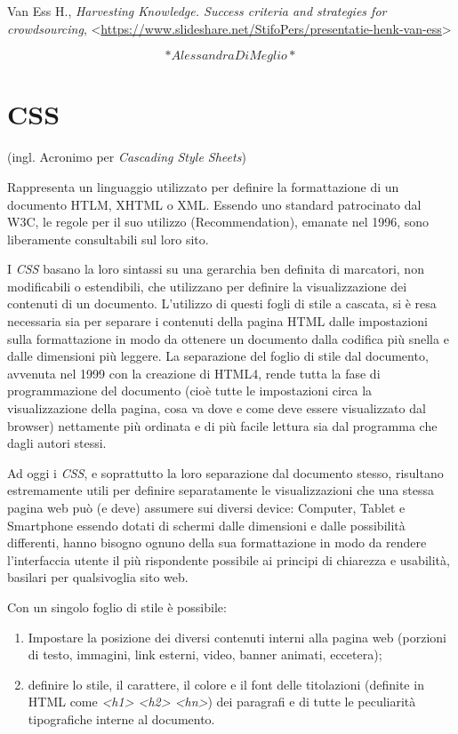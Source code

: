\documentclass[
  b5paper,
  twoside,
  11pt,
  chapterprefix=false,
  bibliography=totocnumbered,
  listof=flat]{scrbook}
\begin{document}
Van Ess H., \emph{Harvesting Knowledge. Success criteria and strategies for
crowdsourcing},
\textless{}\href{https://www.slideshare.net/StifoPers/presentatie-henk-van-ess}{{https://www.slideshare.net/StifoPers/presentatie-henk-van-ess}}\textgreater{}

\[*Alessandra Di Meglio*\]

\hypertarget{css}{%
\chapter{CSS}\label{css}}

(ingl. Acronimo per \emph{Cascading Style Sheets})

Rappresenta un linguaggio utilizzato per definire la formattazione di un
documento HTLM, XHTML o XML. Essendo uno standard patrocinato dal W3C,
le regole per il suo utilizzo (Recommendation), emanate nel 1996, sono
liberamente consultabili sul loro sito.

I \emph{CSS} basano la loro sintassi su una gerarchia ben definita di
marcatori, non modificabili o estendibili, che utilizzano per definire
la visualizzazione dei contenuti di un documento. L'utilizzo di questi
fogli di stile a cascata, si è resa necessaria sia per separare i
contenuti della pagina HTML dalle impostazioni sulla formattazione in
modo da ottenere un documento dalla codifica più snella e dalle
dimensioni più leggere. La separazione del foglio di stile dal
documento, avvenuta nel 1999 con la creazione di HTML4, rende tutta la
fase di programmazione del documento (cioè tutte le impostazioni circa
la visualizzazione della pagina, cosa va dove e come deve essere
visualizzato dal browser) nettamente più ordinata e di più facile
lettura sia dal programma che dagli autori stessi.

Ad oggi i \emph{CSS}, e soprattutto la loro separazione dal documento stesso,
risultano estremamente utili per definire separatamente le
visualizzazioni che una stessa pagina web può (e deve) assumere sui
diversi device: Computer, Tablet e Smartphone essendo dotati di schermi
dalle dimensioni e dalle possibilità differenti, hanno bisogno ognuno
della sua formattazione in modo da rendere l'interfaccia utente il più
rispondente possibile ai principi di chiarezza e usabilità, basilari per
qualsivoglia sito web.

Con un singolo foglio di stile è possibile:

\begin{enumerate}
\def\labelenumi{\arabic{enumi}.}
\item
  Impostare la posizione dei diversi contenuti interni alla pagina web
  (porzioni di testo, immagini, link esterni, video, banner animati,
  eccetera);
\item
  definire lo stile, il carattere, il colore e il font delle
  titolazioni (definite in HTML come \emph{\textless h1\textgreater{} \textless h2\textgreater{} \textless hn\textgreater{}}) dei
  paragrafi e di tutte le peculiarità tipografiche interne al
  documento.
\end{enumerate}
\end{document}
